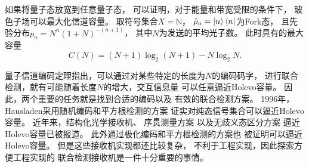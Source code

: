 如果将量子态放宽到任意量子态，
可以证明，对于能量和带宽受限的条件下，
玻色子场可以最大化信道容量\cite{yuen1993ultimate}。
取符号集合$X = \mathbb{N}$，
$\hat{\rho}_n = \ket{n}\bra{n}$为Fork态，
且先验分布$p_n= N^n(1+N)^{-(n+1)}$，
其中$N$为发送的平均光子数。
此时具有的最大容量
\begin{equation}
C(N) = (N+1)\log_2(N+1) -N \log_2 N.
\label{eq:Boson-capacity}
\end{equation}


量子信道编码定理指出，可以通过对某些特定的长度为$N$的编码码字，
进行联合检测，就有可能随着长度$N$的增大，交互信息量
可以任意逼近Holevo容量\cite{hausladen1996classical, holevo1996capacity}。
因此，两个重要的任务就是找到合适的编码以及
有效的联合检测方案。
1996年，Hausladen采用随机编码和平方根检测的方案
证实对纯态信号集合可以逼近Holevo容量。
近年来，结构化光学接收机\cite{guha2011structured}、
序贯测量方案\cite{giovannetti2012achieving}
以及无歧义态区分方案\cite{takeoka2013achieving}
逼近Holevo容量已被报道。
此外通过极化编码和平方根检测的方案也
被证明可以逼近Holevo容量\cite{guha2012polar}。
但是这些接收机实现都还比较复杂，
不利于工程实现，因此探索方便工程实现的
联合检测接收机是一件十分重要的事情。



